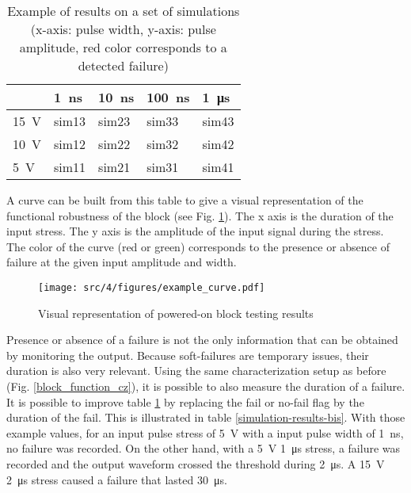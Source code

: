 \begin{table}[!h]
\centering
\begin{tabular}{@{}lllll@{}}
\toprule
               & \SI{1}{\nano\second}         & \SI{10}{\nano\second}        & \SI{100}{\nano\second}       & \SI{1}{\micro\second}        \\ \midrule
\SI{15}{\volt} & {\color[HTML]{FE0000} sim13} & {\color[HTML]{FE0000} sim23} & {\color[HTML]{FE0000} sim33} & {\color[HTML]{FE0000} sim43} \\
\SI{10}{\volt} & {\color[HTML]{32CB00} sim12} & {\color[HTML]{FE0000} sim22} & {\color[HTML]{FE0000} sim32} & {\color[HTML]{FE0000} sim42} \\
\SI{5}{\volt}  & {\color[HTML]{32CB00} sim11} & {\color[HTML]{32CB00} sim21} & {\color[HTML]{32CB00} sim31} & {\color[HTML]{FE0000} sim41} \\
\bottomrule
\end{tabular}
\caption{Example of results on a set of simulations (x-axis: pulse width, y-axis: pulse amplitude, red color corresponds to a detected failure) }
\label{simulation-results}
\end{table}

A curve can be built from this table to give a visual representation of the functional robustness of the block (see Fig. \ref{wb_cz_curve_example}).
The x axis is the duration of the input stress.
The y axis is the amplitude of the input signal during the stress.
The color of the curve (red or green) corresponds to the presence or absence of failure at the given input amplitude and width.

\begin{figure}[!h]
  \centering
  \texttt{[image: src/4/figures/example\_curve.pdf]}
  \caption{Visual representation of powered-on block testing results}
  \label{wb_cz_curve_example}
\end{figure}

Presence or absence of a failure is not the only information that can be obtained by monitoring the output.
Because soft-failures are temporary issues, their duration is also very relevant.
Using the same characterization setup as before (Fig. \ref{block_function_cz}), it is possible to also measure the duration of a failure.
It is possible to improve table \ref{simulation-results} by replacing the fail or no-fail flag by the duration of the fail.
This is illustrated in table \ref{simulation-results-bis}.
With those example values, for an input pulse stress of \SI{5}{\volt} with a input pulse width of \SI{1}{\nano\second}, no failure was recorded.
On the other hand, with a \SI{5}{\volt} \SI{1}{\micro\second} stress, a failure was recorded and the output waveform crossed the threshold during \SI{2}{\micro\second}.
A \SI{15}{\volt} \SI{2}{\micro\second} stress caused a failure that lasted \SI{30}{\micro\second}.


